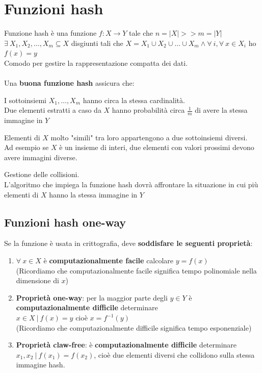 \documentclass[10pt]{book}
\begin{document}
\section{Funzioni hash} Funzione hash è una funzione $f:X\rightarrow Y$ tale che $n = |X| >> m = |Y|$\\
$\exists\:X_1,X_2,\ldots,X_m \subseteq X$ disgiunti tali che $X = X_1 \cup X_2 \cup \ldots \cup X_m\wedge\forall\:i,\forall\:x\in X_i$ ho $f(x) = y$\\
Comodo per gestire la rappresentazione compatta dei dati.\\\\
Una \textbf{buona funzione hash} assicura che:
\begin{list}{}{}
	\item I sottoinsiemi $X_1,\ldots,X_m$ hanno circa la stessa cardinalità.\\
	Due elementi estratti a caso da $X$ hanno probabilità circa $\frac{1}{m}$ di avere la stessa immagine in $Y$
	\item Elementi di $X$ molto "simili" tra loro appartengono a due sottoinsiemi diversi.\\
	Ad esempio se $X$ è un insieme di interi, due elementi con valori prossimi devono avere immagini diverse.
	\item Gestione delle collisioni.\\
	L'algoritmo che impiega la funzione hash dovrà affrontare la situazione in cui più elementi di $X$ hanno la stessa immagine in $Y$
\end{list}
\subsection{Funzioni hash one-way} Se la funzione è usata in crittografia, deve \textbf{soddisfare le seguenti proprietà}:
\begin{enumerate}
	\item $\forall\:x\in X$ è \textbf{computazionalmente facile} calcolare $y = f(x)$\\
	(Ricordiamo che computazionalmente facile significa tempo polinomiale nella dimensione di $x$)
	\item \textbf{Proprietà one-way}: per la maggior parte degli $y\in Y$ è \textbf{computazionalmente difficile} determinare\\$x\in X\:|\:f(x) = y$ cioè $x = f^{-1}(y)$\\
	(Ricordiamo che computazionalmente difficile significa tempo esponenziale)
	\item \textbf{Proprietà claw-free}: è \textbf{computazionalmente difficile} determinare $x_1,x_2\:|\:f(x_1) = f(x_2)$, cioè due elementi diversi che collidono sulla stessa immagine hash.
\end{enumerate}
\end{document}

